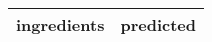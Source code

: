 \begin{tabular}{p{7cm}p{7cm}}
\toprule
                                                                                                                                                                                                                                                                                                                                                                                                                                                                  ingredients &                                                                                                                                                                                                                                                                                                                                                                                                                                                                                                                                                                                                                                                                                                                                                                                                                                                                                                                                                                                                                                                                                                                                                                                                                                                                                                                                                                                                                              predicted \\
\midrule

\end{tabular}
